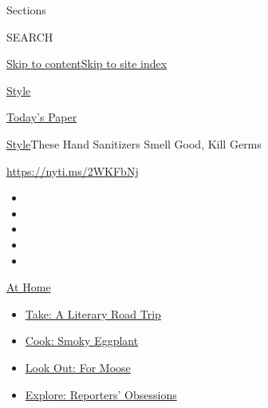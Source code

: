 Sections

SEARCH

\protect\hyperlink{site-content}{Skip to
content}\protect\hyperlink{site-index}{Skip to site index}

\href{https://www.nytimes3xbfgragh.onion/section/style}{Style}

\href{https://myaccount.nytimes3xbfgragh.onion/auth/login?response_type=cookie\&client_id=vi}{}

\href{https://www.nytimes3xbfgragh.onion/section/todayspaper}{Today's
Paper}

\href{/section/style}{Style}\textbar{}These Hand Sanitizers Smell Good,
Kill Germs

\url{https://nyti.ms/2WKFbNj}

\begin{itemize}
\item
\item
\item
\item
\item
\end{itemize}

\href{https://www.nytimes3xbfgragh.onion/spotlight/at-home?action=click\&pgtype=Article\&state=default\&region=TOP_BANNER\&context=at_home_menu}{At
Home}

\begin{itemize}
\tightlist
\item
  \href{https://www.nytimes3xbfgragh.onion/2020/07/28/books/time-for-a-literary-road-trip.html?action=click\&pgtype=Article\&state=default\&region=TOP_BANNER\&context=at_home_menu}{Take:
  A Literary Road Trip}
\item
  \href{https://www.nytimes3xbfgragh.onion/2020/07/29/magazine/bored-with-your-home-cooking-some-smoky-eggplant-will-fix-that.html?action=click\&pgtype=Article\&state=default\&region=TOP_BANNER\&context=at_home_menu}{Cook:
  Smoky Eggplant}
\item
  \href{https://www.nytimes3xbfgragh.onion/2020/07/27/travel/moose-michigan-isle-royale.html?action=click\&pgtype=Article\&state=default\&region=TOP_BANNER\&context=at_home_menu}{Look
  Out: For Moose}
\item
  \href{https://www.nytimes3xbfgragh.onion/interactive/2020/at-home/even-more-reporters-editors-diaries-lists-recommendations.html?action=click\&pgtype=Article\&state=default\&region=TOP_BANNER\&context=at_home_menu}{Explore:
  Reporters' Obsessions}
\end{itemize}

